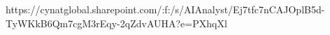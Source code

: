 https://cynatglobal.sharepoint.com/:f:/s/AIAnalyst/Ej7tfc7nCAJOplB5d-TyWKkB6Qm7cgM3rEqy-2qZdvAUHA?e=PXhqXl
